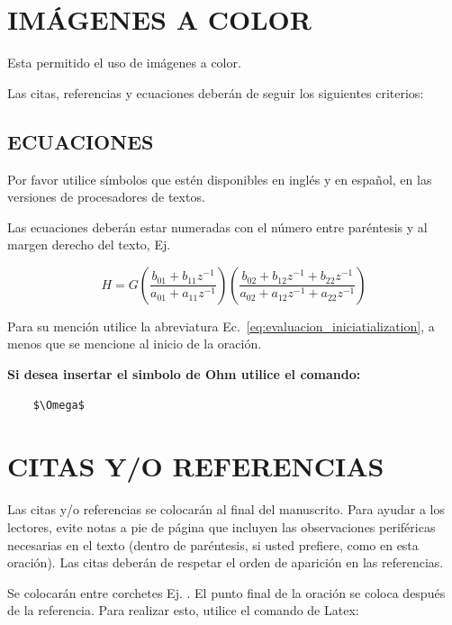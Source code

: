 \documentclass[journal,onecolumn]{IEEEtran}
\begin{document}
\section{IMÁGENES A COLOR}
Esta permitido el uso de imágenes a color.

Las citas, referencias y ecuaciones deberán de seguir los siguientes criterios: \cite{stat}

\subsection{ECUACIONES}

Por favor utilice símbolos que estén disponibles en  inglés y en español, en las versiones de procesadores de textos.

Las ecuaciones deberán estar numeradas con el número entre paréntesis y al margen derecho del texto, Ej.

\begin{equation} 
\label{eq:evaluacion_iniciatialization}
H=G\left(\frac{b_{01}+b_{11}z^{-1}}{a_{01}+a_{11}z^{-1}} \right)\left(\frac{b_{02}+b_{12}z^{-1}+b_{22}z^{-1}}{a_{02}+a_{12}z^{-1}+a_{22}z^{-1}} \right)
\end{equation}


Para su mención utilice la abreviatura Ec.~\ref{eq:evaluacion_iniciatialization}, a menos que se mencione al inicio de la oración. 

\textbf{Si desea insertar el simbolo de Ohm utilice el comando:}

\begin{verbatim}
    $\Omega$
\end{verbatim}





\section{CITAS Y/O REFERENCIAS}

Las citas y/o referencias se colocarán al final del manuscrito. Para ayudar a los lectores, evite notas a pie de página que incluyen las observaciones periféricas necesarias en el texto (dentro de paréntesis, si usted prefiere, como en esta oración). Las citas deberán de respetar el orden de aparición en las referencias.

Se colocarán entre corchetes Ej. \cite{stat1}. El punto final de la oración se coloca después de la referencia. Para realizar esto, utilice el comando de Latex:
\end{document}
